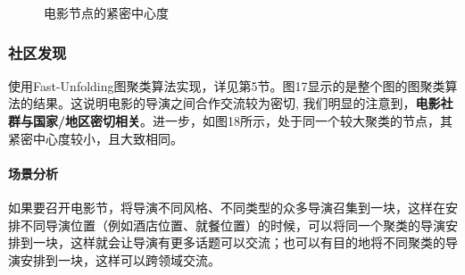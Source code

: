 \documentclass[UTF8, onecolumn, a4paper]{article}
\begin{document}
\begin{center}
\begin{figure}[ht]
\begin{minipage}[b]{0.95\linewidth}
\begin{minipage}[b]{0.46\linewidth}
				\caption{电影节点的紧密中心度}
			\end{minipage}
		\end{minipage}
	\end{figure}
\end{center}
\subsubsection{社区发现}
    使用Fast-Unfolding图聚类算法实现，详见第5节。图17显示的是整个图的图聚类算法的结果。这说明电影的导演之间合作交流较为密切, 我们明显的注意到，\textbf{电影社群与国家/地区密切相关}。进一步，如图18所示，处于同一个较大聚类的节点，其紧密中心度较小，且大致相同。
 
    \paragraph{场景分析} 如果要召开电影节，将导演不同风格、不同类型的众多导演召集到一块，这样在安排不同导演位置（例如酒店位置、就餐位置）的时候，可以将同一个聚类的导演安排到一块，这样就会让导演有更多话题可以交流；也可以有目的地将不同聚类的导演安排到一块，这样可以跨领域交流。
\end{document}
